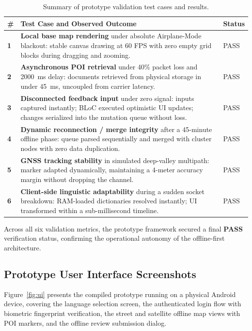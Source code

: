\documentclass[12pt,a4paper,oneside]{report}
\begin{document}
\begin{table}[ht]
\centering
\caption{Summary of prototype validation test cases and results.}
\label{tab:tests}
\renewcommand{\arraystretch}{1.3}
\begin{tabularx}{\textwidth}{>{\bfseries}p{0.4cm} X >{\centering\arraybackslash}p{1.4cm}}
\toprule
\textnormal{\textbf{\#}} & \textbf{Test Case and Observed Outcome} & \textbf{Status} \\
\midrule
1 & \textbf{Local base map rendering} under absolute Airplane-Mode blackout: stable canvas drawing at 60 FPS with zero empty grid blocks during dragging and zooming. & PASS \\
2 & \textbf{Asynchronous POI retrieval} under 40\% packet loss and 2000~ms delay: documents retrieved from physical storage in under 45~ms, uncoupled from carrier latency. & PASS \\
3 & \textbf{Disconnected feedback input} under zero signal: inputs captured instantly; BLoC executed optimistic UI updates; changes serialized into the mutation queue without loss. & PASS \\
4 & \textbf{Dynamic reconnection / merge integrity} after a 45-minute offline phase: queue parsed sequentially and merged with cluster nodes with zero data duplication. & PASS \\
5 & \textbf{GNSS tracking stability} in simulated deep-valley multipath: marker adapted dynamically, maintaining a 4-meter accuracy margin without dropping the channel. & PASS \\
6 & \textbf{Client-side linguistic adaptability} during a sudden socket breakdown: RAM-loaded dictionaries resolved instantly; UI transformed within a sub-millisecond timeline. & PASS \\
\bottomrule
\end{tabularx}
\end{table}

Across all six validation metrics, the prototype framework secured a final \textbf{PASS}
verification status, confirming the operational autonomy of the offline-first architecture.

\subsection{Prototype User Interface Screenshots}

Figure~\ref{fig:ui} presents the compiled prototype running on a physical Android device,
covering the language selection screen, the authenticated login flow with biometric
fingerprint verification, the street and satellite offline map views with POI markers, and
the offline review submission dialog.
\end{document}
